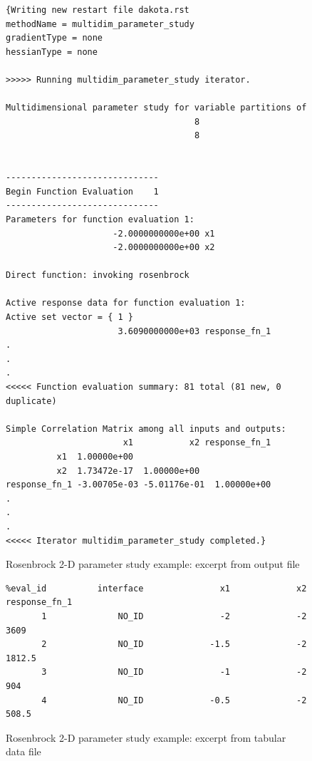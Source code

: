 \begin{figure}[ht!]
  \centering
  \begin{bigbox}
    \begin{small}
      \begin{verbatim}
{Writing new restart file dakota.rst
methodName = multidim_parameter_study
gradientType = none
hessianType = none

>>>>> Running multidim_parameter_study iterator.

Multidimensional parameter study for variable partitions of
                                     8
                                     8


------------------------------
Begin Function Evaluation    1
------------------------------
Parameters for function evaluation 1:
                     -2.0000000000e+00 x1
                     -2.0000000000e+00 x2

Direct function: invoking rosenbrock 

Active response data for function evaluation 1:
Active set vector = { 1 }
                      3.6090000000e+03 response_fn_1
.
.
.
<<<<< Function evaluation summary: 81 total (81 new, 0 duplicate)

Simple Correlation Matrix among all inputs and outputs:
                       x1           x2 response_fn_1 
          x1  1.00000e+00 
          x2  1.73472e-17  1.00000e+00 
response_fn_1 -3.00705e-03 -5.01176e-01  1.00000e+00 
. 
.
.
<<<<< Iterator multidim_parameter_study completed.}
\end{verbatim}
    \end{small}
  \end{bigbox}
\caption{Rosenbrock 2-D parameter study example: excerpt from output file}
\label{tutorial:quickstart:rosenbrock_multidim:output}
\end{figure}


\begin{figure}[ht!]
  \centering
  \begin{bigbox}
    \begin{small}
      \begin{verbatim}
%eval_id          interface               x1             x2  response_fn_1 
       1              NO_ID               -2             -2           3609 
       2              NO_ID             -1.5             -2         1812.5 
       3              NO_ID               -1             -2            904 
       4              NO_ID             -0.5             -2          508.5 
\end{verbatim}
    \end{small}
  \end{bigbox}
\label{tutorial:quickstart:rosenbrock_multidim:dat}
\caption{Rosenbrock 2-D parameter study example: excerpt from tabular data file}
\end{figure}


